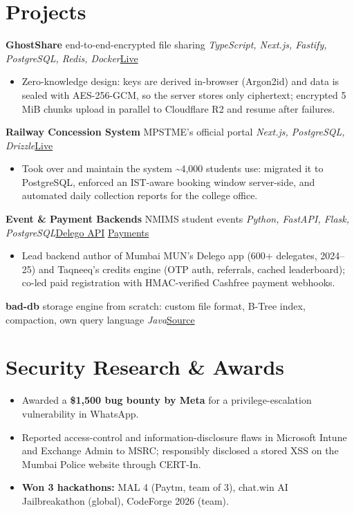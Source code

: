 \documentclass[10pt, a4paper]{article}
\newcommand{\proj}[4]{\par\vspace{2.5pt}\textbf{#1} \textbar{} #2 \textbar{} \textit{\small #3}\hfill{\small #4}\par}
\newcommand{\lnk}[2]{\href{#1}{\color{linkc}#2}}
\begin{document}
\section{Projects}
\proj{GhostShare}{end-to-end-encrypted file sharing}{TypeScript, Next.js, Fastify, PostgreSQL, Redis, Docker}{\lnk{https://share.jkartik.in}{Live}}
\begin{itemize}
  \item Zero-knowledge design: keys are derived in-browser (Argon2id) and data is sealed with AES-256-GCM, so the server
  stores only ciphertext; encrypted 5 MiB chunks upload in parallel to Cloudflare R2 and resume after failures.
\end{itemize}
\proj{Railway Concession System}{MPSTME's official portal}{Next.js, PostgreSQL, Drizzle}{\lnk{https://concession.mpst.me}{Live}}
\begin{itemize}
  \item Took over and maintain the system \textasciitilde{}4,000 students use: migrated it to PostgreSQL, enforced an
  IST-aware booking window server-side, and automated daily collection reports for the college office.
\end{itemize}
\proj{Event \& Payment Backends}{NMIMS student events}{Python, FastAPI, Flask, PostgreSQL}{\lnk{https://github.com/munsoc-mpstme/mundra}{Delego API}\,\textbar\,\lnk{https://github.com/MPSTME-ACM/pfe-regi}{Payments}}
\begin{itemize}
  \item Lead backend author of Mumbai MUN's Delego app (600+ delegates, 2024--25) and Taqneeq's credits engine (OTP
  auth, referrals, cached leaderboard); co-led paid registration with HMAC-verified Cashfree payment webhooks.
\end{itemize}
\par\vspace{2.5pt}\textbf{bad-db} \textbar{} storage engine from scratch: custom file format, B-Tree index, compaction, own query language \textbar{} \textit{\small Java}\hfill{\small\lnk{https://github.com/KartikJain14/bad-db}{Source}}\par

\section{Security Research \& Awards}
\begin{itemize}
  \item Awarded a \textbf{\$1,500 bug bounty by Meta} for a privilege-escalation vulnerability in WhatsApp.
  \item Reported access-control and information-disclosure flaws in Microsoft Intune and Exchange Admin to MSRC;
  responsibly disclosed a stored XSS on the Mumbai Police website through CERT-In.
  \item \textbf{Won 3 hackathons:} MAL 4 (Paytm, team of 3), chat.win AI Jailbreakathon (global), CodeForge 2026 (team).
\end{itemize}
\end{document}
